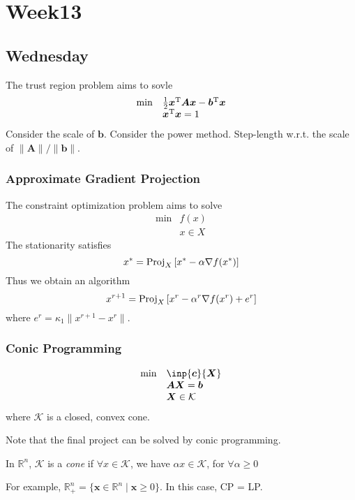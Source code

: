 \chapter{Week13}
\section{Wednesday}
The trust region problem aims to sovle
\begin{equation}
\begin{array}{ll}
\min&\frac{1}{2}\bm x^{\mathrm T}\bm A\bm x-\bm b^{\mathrm T}\bm x\\
&\bm x^{\mathrm T}\bm x=1
\end{array}
\end{equation}
Consider the scale of $\bm b$. Consider the power method. Step-length w.r.t. the scale of $\|\bm A\|/\|\bm b\|$.

\subsection{Approximate Gradient Projection}
The constraint optimization problem aims to solve
\begin{equation}
\begin{array}{ll}
\min&f(x)\\
&x\in X
\end{array}
\end{equation}
The stationarity satisfies
\[
x^*=\operatorname{Proj}_X\left[x^*-\alpha\nabla f(x^*)\right]
\]
Thus we obtain an algorithm
\[
x^{r+1}=
\operatorname{Proj}_X\left[x^r-\alpha^r\nabla f(x^r)+e^r\right]
\]
where $e^r=\kappa_1\|x^{r+1} - x^r\|$.

\subsection{Conic Programming}
\begin{equation}
\begin{array}{ll}
\min&\inp{\bm c}{\bm X}\\
&\bm A\bm X=\bm b\\
&\bm X\in\mathcal{K}
\end{array}
\end{equation}
where $\mathcal{K}$ is a closed, convex cone.
\begin{remark}
Note that the final project can be solved by conic programming.
\end{remark}
\begin{definition}[Cone]
In $\mathbb{R}^n$, $\mathcal{K}$ is a \emph{cone} if $\forall x\in\mathcal{K}$, we have $\alpha x\in\mathcal{K}$, for $\forall\alpha\ge0$
\end{definition}
For example, $\mathbb{R}_+^n=\{\bm x\in\mathbb{R}^n\mid\bm x\ge0\}$. In this case, CP = LP.

